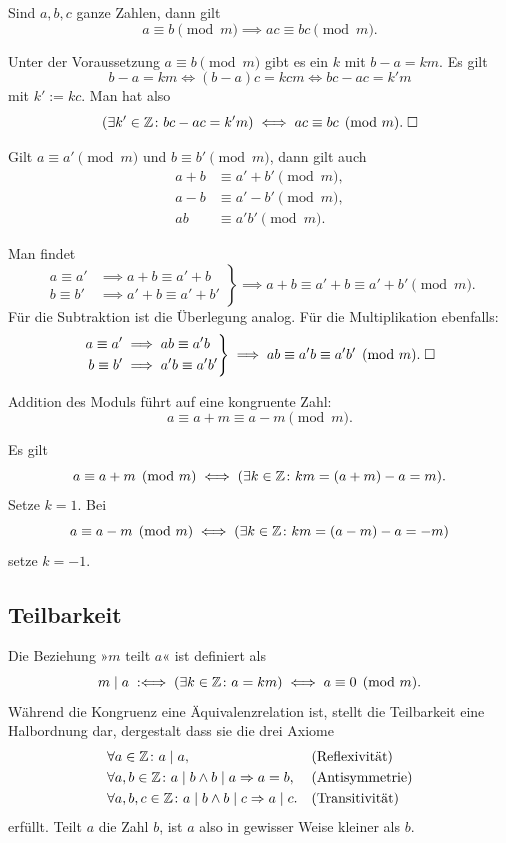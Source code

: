 \begin{Satz}\label{Kongruenz-mul}
Sind $a,b,c$ ganze Zahlen, dann gilt
\[a\equiv b\pmod{m} \implies ac\equiv bc\pmod{m}.\]
\end{Satz}
\begin{Beweis}
Unter der Voraussetzung $a\equiv b\pmod{m}$ gibt es ein
$k$ mit $b-a=km$. Es gilt
\[b-a=km\iff (b-a)c=kcm \iff bc-ac=k'm\]
mit $k':=kc$. Man hat also
\[(\exists k'\in\mathbb Z\colon bc-ac=k'm)\iff ac\equiv bc\pmod{m}.\;\Box\]
\end{Beweis}

\begin{Satz}
Gilt $a\equiv a'\pmod{m}$ und
$b\equiv b'\pmod{m}$, dann gilt auch
\begin{align*}
a+b&\equiv a'+b'\pmod{m},\\
a-b&\equiv a'-b'\pmod{m},\\
ab&\equiv a'b'\pmod{m}.
\end{align*}
\end{Satz}
 Man findet
\[\left.\begin{aligned}
a\equiv a'&\implies a+b\equiv a'+b\\
b\equiv b'&\implies a'+b\equiv a'+b'
\end{aligned}\right\}
\implies a+b\equiv a'+b\equiv a'+b'\pmod{m}.\]
Für die Subtraktion ist die Überlegung analog. Für die Multiplikation
ebenfalls:%
\[\left.\begin{aligned}
a\equiv a'&\implies ab\equiv a'b\\
b\equiv b'&\implies a'b\equiv a'b'
\end{aligned}\right\}
\implies ab\equiv a'b\equiv a'b'\pmod{m}.\;\Box\]

\begin{Satz}
Addition des Moduls führt auf eine kongruente Zahl:%
\[a\equiv a+m\equiv a-m\pmod{m}.\]
\end{Satz}
\begin{Beweis}
Es gilt
\[a\equiv a+m\pmod{m}\iff (\exists k\in\mathbb Z\colon km=(a+m)-a=m).\]
Setze $k=1$. Bei
\[a\equiv a-m\pmod{m}\iff (\exists k\in\mathbb Z\colon km=(a-m)-a=-m)\]
setze $k=-1$.\;\qedsymbol
\end{Beweis}

\subsection{Teilbarkeit}

Die Beziehung »$m$ teilt $a$« ist definiert als
\[m\mid a\;:\Longleftrightarrow\; (\exists k\in\mathbb Z\colon a=km) \iff a\equiv 0\pmod{m}.\]
Während die Kongruenz eine Äquivalenzrelation ist, stellt die
Teilbarkeit eine Halbordnung dar, dergestalt dass sie die drei Axiome
\begin{align*}
&\forall a\in\mathbb Z\colon a\mid a, &&\text{(Reflexivität)}\\
&\forall a,b\in\mathbb Z\colon a\mid b\land b\mid a\Rightarrow a = b,&&\text{(Antisymmetrie)}\\
&\forall a,b,c\in\mathbb Z\colon a\mid b\land b\mid c\Rightarrow a\mid c.&&\text{(Transitivität)}
\end{align*}
erfüllt. Teilt $a$ die Zahl $b$, ist $a$ also in gewisser Weise kleiner
als $b$.

